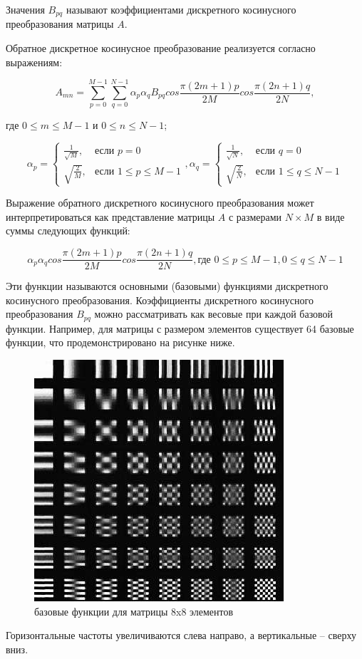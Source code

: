 Значения $B_{pq}$ называют коэффициентами дискретного косинусного преобразования матрицы $A$.

Обратное дискретное косинусное преобразование реализуется согласно выражениям:

\[
    A_{mn} = \sum_{p=0}^{M-1} \sum_{q=0}^{N-1} \alpha_p \alpha_q B_{pq} cos \frac{\pi(2m+1)p}{2M} cos \frac{\pi(2n+1)q}{2N},
\]

где $0 \leq m \leq M-1$ и $0 \leq n \leq N-1$;

\[
    \alpha_p = 
    \begin{cases}
        \frac{1}{\sqrt{M}}, & \text{если } p =0 \\
        \sqrt{\frac{2}{M}}, & \text{если } 1 \leq p \leq M-1
    \end{cases},
    \alpha_q = 
    \begin{cases}
        \frac{1}{\sqrt{N}}, & \text{если } q =0 \\
        \sqrt{\frac{2}{N}}, & \text{если } 1 \leq q \leq N-1
    \end{cases}
\]

Выражение обратного дискретного косинусного преобразования может интерпретироваться как представление матрицы $A$ с размерами $N \times M$  в виде суммы следующих функций:

\[
    \alpha_p \alpha_q cos \frac{\pi (2m+1)p}{2M} cos \frac{\pi (2n+1)q}{2N}, \text{где } 0 \leq p \leq M-1, 0 \leq q \leq N-1
\]

Эти функции называются основными (базовыми) функциями дискретного косинусного преобразования. Коэффициенты дискретного косинусного преобразования $B_{pq}$ можно рассматривать как весовые при каждой базовой функции. Например, для матрицы с размером  элементов существует 64 базовые функции, что продемонстрировано на рисунке ниже.

\begin{figure}[H]
    \centering
    \includegraphics[width=.9\textwidth]{img/dcp-1.jpg}    
    \caption{базовые функции для матрицы 8x8 элементов}
\end{figure}


Горизонтальные частоты увеличиваются слева направо, а вертикальные – сверху вниз.

